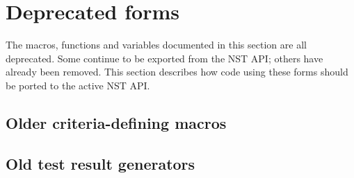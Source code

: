
\section{Deprecated forms}
The macros, functions and variables documented in this section are all
deprecated.  Some continue to be exported from the NST API; others
have already been removed.  This section describes how code using
these forms should be ported to the active NST API.

\subsection{Older criteria-defining macros}
\label{sec:def-values-criterion}
\label{sec:def-form-criterion}






\subsection{Old test result generators}




